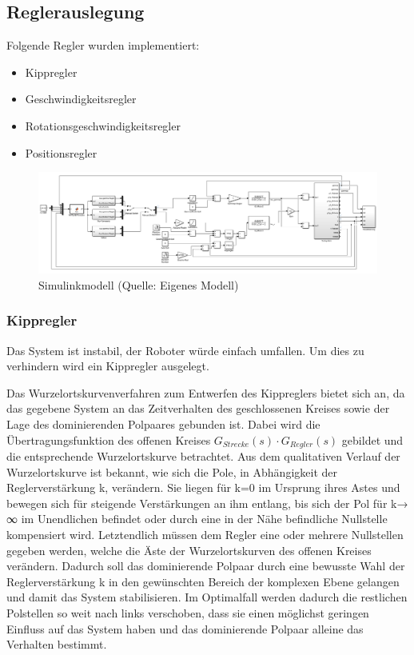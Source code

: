 \newpage
\subsection{Reglerauslegung}
Folgende Regler wurden implementiert:
\begin{itemize}
	\item Kippregler
	\item Geschwindigkeitsregler
	\item Rotationsgeschwindigkeitsregler
	\item Positionsregler
\end{itemize}

\begin{figure}[!h]  %
	\centering\includegraphics[width=1.0\textwidth]{images/SimulinkReglerstruktur.png}
	\caption{Simulinkmodell \newline(Quelle: Eigenes Modell)}
	\label{bild_1.1} %
\end{figure}

\subsubsection{Kippregler}
Das System ist instabil, der Roboter würde einfach umfallen. Um dies zu verhindern wird ein Kippregler ausgelegt.

Das Wurzelortskurvenverfahren zum Entwerfen des Kippreglers bietet sich an, da das gegebene System an das Zeitverhalten des geschlossenen Kreises sowie der Lage des dominierenden Polpaares gebunden ist.  Dabei wird die Übertragungsfunktion des offenen Kreises $G_{Strecke}(s)\cdot G_{Regler}(s)$ gebildet und die entsprechende Wurzelortskurve betrachtet. Aus dem qualitativen Verlauf der Wurzelortskurve ist bekannt, wie sich die Pole, in Abhängigkeit der Reglerverstärkung k, verändern. Sie liegen für k=0 im Ursprung ihres Astes und bewegen sich für steigende Verstärkungen an ihm entlang, bis sich der Pol für k→ ∞ im Unendlichen befindet oder durch eine in der Nähe befindliche Nullstelle kompensiert wird. Letztendlich müssen dem Regler eine oder mehrere Nullstellen gegeben werden, welche die Äste der Wurzelortskurven des offenen Kreises verändern. Dadurch soll das dominierende Polpaar durch eine bewusste Wahl der Reglerverstärkung k in den gewünschten Bereich der komplexen Ebene gelangen und damit das System stabilisieren. Im Optimalfall werden dadurch die restlichen Polstellen so weit nach links verschoben, dass sie einen möglichst geringen Einfluss auf das System haben und das dominierende Polpaar alleine das Verhalten bestimmt.

